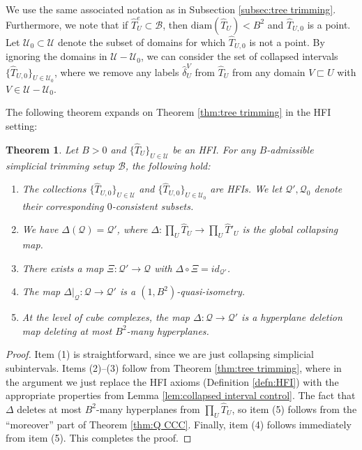 \documentclass{amsart}
\newtheorem{theorem}{Theorem}[section]
\theoremstyle{definition}
\theoremstyle{remark}
\theoremstyle{definition}
\newcommand{\calB}{\mathcal{B}}
\newcommand{\calQ}{\mathcal{Q}}
\newcommand{\calU}{\mathcal{U}}
\newcommand{\hT}{\widehat{T}}
\newcommand{\hd}{\hat{\delta}}
\newcommand{\diam}{\mathrm{diam}}
\newcommand{\nest}{\sqsubset}
\begin{document}
We use the same associated notation as in Subsection \ref{subsec:tree trimming}.  Furthermore, we note that if $\hT^e_U \subset \calB$, then $\diam (\hT_U) < B^2$ and $\hT_{U,0}$ is a point.  Let $\calU_0 \subset \calU$ denote the subset of domains for which $\hT_{U,0}$ is not a point.  By ignoring the domains in $\calU - \calU_0$, we can consider the set of collapsed intervals $\{\hT_{U,0}\}_{U \in \calU_0}$, where we remove any labels $\hd^V_U$ from $\hT_U$ from any domain $V \nest U$ with $V \in \calU - \calU_0$.

The following theorem expands on Theorem \ref{thm:tree trimming} in the HFI setting:

\begin{theorem}\label{thm:simplicial tree trimming}
Let $B>0$ and $\{\hT_U\}_{U \in \calU}$ be an HFI.  For any $B$-admissible simplicial trimming setup $\calB$, the following hold:

\begin{enumerate}
\item The collections $\{\hT_{U,0}\}_{U \in \calU}$ and $\{\hT_{U,0}\}_{U \in \calU_0}$ are HFIs.  We let $\calQ', \calQ_0$ denote their corresponding $0$-consistent subsets.
\item We have $\Delta(\calQ) = \calQ'$, where $\Delta:\prod_U \hT_U \to \prod_U \hT'_U$ is the global collapsing map.
\item There exists a map $\Xi:\calQ' \to \calQ$ with $\Delta \circ \Xi = id_{\calQ'}$.
\item The map $\Delta|_{\calQ}: \calQ \to \calQ'$ is a $(1, B^2)$-quasi-isometry.
\item At the level of cube complexes, the map $\Delta:\calQ \to \calQ'$ is a hyperplane deletion map deleting at most $B^2$-many hyperplanes.
\end{enumerate}

\end{theorem}

\begin{proof}
Item (1) is straightforward, since we are just collapsing simplicial subintervals.  Items (2)--(3) follow from Theorem \ref{thm:tree trimming}, where in the argument we just replace the HFI axioms (Definition \ref{defn:HFI}) with the appropriate properties from Lemma \ref{lem:collapsed interval control}.  The fact that $\Delta$ deletes at most $B^2$-many hyperplanes from $\prod_U \hT_U$, so item (5) follows from the ``moreover'' part of Theorem \ref{thm:Q CCC}.  Finally, item (4) follows immediately from item (5).  This completes the proof.


\end{proof}
\end{document}
